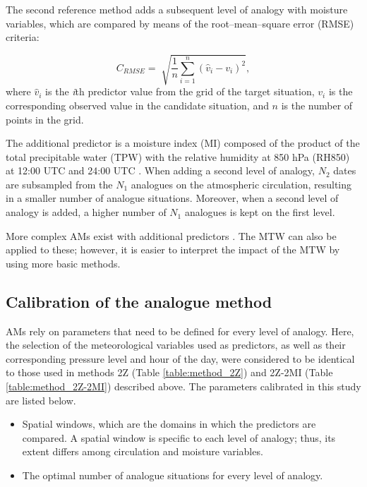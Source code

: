 \documentclass[hess, manuscript]{copernicus}
\begin{document}
	The second reference method \citep[2Z-2MI, Table \ref{table:method_2Z-2MI};][]{Bontron2005} adds a subsequent level of analogy with moisture variables, which are compared by means of the root--mean--square error (RMSE) criteria:
	
	\begin{equation}
	\label{eq:RMSE}
	C_{RMSE}= \sqrt[]{ \frac{1}{n} \sum_{i=1}^{n}(\hat{v}_{i} - v_{i})^{2}} ,
	\end{equation}
	where $\hat{v}_{i}$ is the \textit{i}th predictor value from the grid of the target situation, $v_{i}$ is the corresponding observed value in the candidate situation, and $n$ is the number of points in the grid.
	
	The additional predictor is a moisture index (MI) composed of the product of the total precipitable water (TPW) with the relative humidity at 850 hPa (RH850) at 12:00 UTC and 24:00 UTC \citep{Bontron2004}. When adding a second level of analogy, $N_{2}$ dates are subsampled from the $N_{1}$ analogues on the atmospheric circulation, resulting in a smaller number of analogue situations. Moreover, when a second level of analogy is added, a higher number of $N_{1}$ analogues is kept on the first level.
	
	More complex AMs exist with additional predictors \citep[e.g.][]{Horton2012a, BenDaoud2016, Caillouet2016}. The MTW can also be applied to these; however, it is easier to interpret the impact of the MTW by using more basic methods.
	
	
	\subsection{Calibration of the analogue method}
	\label{sec:calibration}
	
	AMs rely on parameters that need to be defined for every level of analogy. Here, the selection of the meteorological variables used as predictors, as well as their corresponding pressure level and hour of the day, were considered to be identical to those used in methods 2Z (Table \ref{table:method_2Z}) and 2Z-2MI (Table \ref{table:method_2Z-2MI}) described above. The parameters calibrated in this study are listed below.
	
	\begin{itemize}
		\item Spatial windows, which are the domains in which the predictors are compared. A spatial window is specific to each level of analogy; thus, its extent differs among circulation and moisture variables.
		\item The optimal number of analogue situations for every level of analogy.
	\end{itemize}
	
\end{document}
